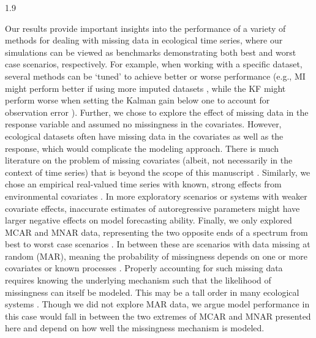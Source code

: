\documentclass[12pt,english]{article} %
\begin{document}
\begin{linenumbers}
\begin{spacing}{1.9}
\begin{flushleft}


         
\hspace{1em} Our results provide important insights into the performance of a variety of methods for dealing with missing data in ecological time series, where our simulations can be viewed as benchmarks demonstrating both best and worst case scenarios, respectively. For example, when working with a specific dataset, several methods can be `tuned' to achieve better or worse performance (e.g., MI might perform better if using more imputed datasets \citep{honaker_what_2010}, while the KF might perform worse when setting the Kalman gain below one to account for observation error \citep{kalman_filter_1960}). Further, we chose to explore the effect of missing data in the response variable and assumed no missingness in the covariates. However, ecological datasets often have missing data in the covariates as well as the response, which would complicate the modeling approach. There is much literature on the problem of missing covariates (albeit, not necessarily in the context of time series) that is beyond the scope of this manuscript \citep{Little_1992}.
Similarly, we chose an empirical real-valued time series with known, strong effects from environmental covariates \citep{hall_turbidity_2015,bernhardt2022light}.
In more exploratory scenarios or systems with weaker covariate effects, inaccurate estimates of autoregressive parameters might have larger negative effects on model forecasting ability. Finally, we only explored MCAR and MNAR data, representing the two opposite ends of a spectrum from best to worst case scenarios \citep{newman_missing_2014}. In between these are scenarios with data missing at random (MAR), meaning the probability of missingness depends on one or more covariates or known processes \citep{newman_missing_2014}. Properly accounting for such missing data requires knowing the underlying mechanism such that the likelihood of missingness can itself be modeled. This may be a tall order in many ecological systems \citep[e.g.,][]{Sotto2011_mnar, McCall2014_mnar, Shoari2018_mnar}. Though we did not explore MAR data, we argue model performance in this case would fall in between the two extremes of MCAR and MNAR presented here and depend on how well the missingness mechanism is modeled. 


\end{flushleft}
\end{spacing}
\end{linenumbers}
\end{document}
